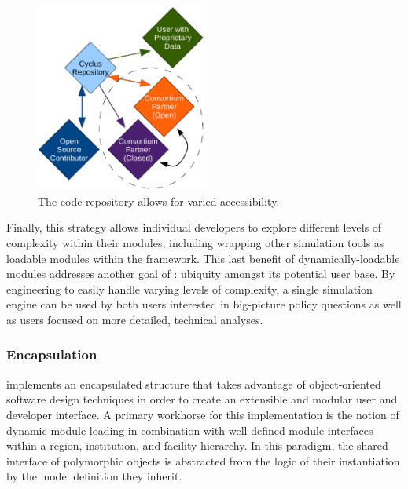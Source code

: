 \begin{figure}[htb!]
  \begin{center}
    \includegraphics[width=0.5\textwidth]{./chapters/paradigm/openness.eps}
  \end{center}
  \caption{The \Cyclus code repository allows for varied accessibility.}
  \label{fig:repo}
\end{figure}

Finally, this strategy allows individual developers to
explore different levels of complexity within their modules, including
wrapping other simulation tools as loadable modules within the \Cyclus 
framework. This last benefit of dynamically-loadable modules addresses 
another goal of \Cyclus: ubiquity amongst its potential user base. By
engineering \Cyclus to easily handle varying levels of complexity, a single
simulation engine can be used by both users interested in big-picture policy
questions as well as users focused on more detailed, technical
analyses.

\subsubsection{Encapsulation}

\Cyclus implements an encapsulated structure that takes advantage of 
object-oriented software design techniques in order to create an 
extensible and modular user and developer interface. A primary 
workhorse for this implementation is the notion of dynamic module 
loading in combination with  well defined module interfaces within 
a region, institution, and facility  hierarchy. In this paradigm, 
the shared interface of polymorphic objects is abstracted from the 
logic of their instantiation by the model definition they inherit.  

